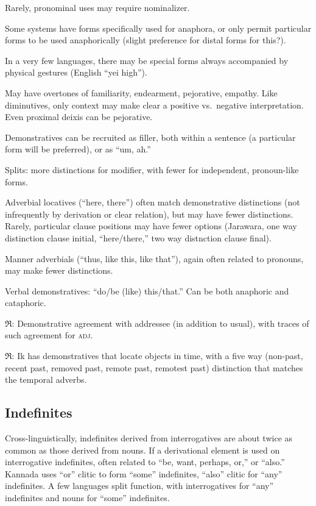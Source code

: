 \documentclass[11pt]{article}
\newcommand{\I}[1]{\textsc{#1}}   %
\newcommand{\rara}[1]{$\mathfrak{R}$: #1}
\begin{document}
Rarely, pronominal uses may require nominalizer.

Some systems have forms specifically used for anaphora, or only permit
particular forms to be used anaphorically (slight preference for
distal forms for this?).

In a very few languages, there may be special forms always accompanied
by physical gestures (English ``yei high'').

May have overtones of familiarity, endearment, pejorative,
empathy.  Like diminutives, only context may make clear a positive
vs.\ negative interpretation.  Even proximal deixis can be
pejorative. 

Demonstratives can be recruited as filler, both within a sentence (a
particular form will be preferred), or as ``um, ah.''

Splits: more distinctions for modifier, with fewer for independent,
pronoun-like forms. 

Adverbial locatives (``here, there'') often match demonstrative
distinctions (not infrequently by derivation or clear relation), but
may have fewer distinctions.  Rarely, particular clause positions may
have fewer options (Jarawara, one way distinction clause initial,
``here/there,'' two way distnction clause final).

Manner adverbials (``thus, like this, like that''), again often
related to pronouns, may make fewer distinctions.

Verbal demonstratives: ``do/be (like) this/that.'' Can be both
anaphoric and cataphoric.

\rara{Demonstrative agreement with addressee (in addition to usual),
  with traces of such agreement for \I{adj}.}

\rara{Ik has demonstratives that locate objects in time, with a
five way (non-past, recent past, removed past, remote past, remotest
past) distinction that matches the temporal adverbs.}

\subsection{Indefinites}
Cross-linguistically, indefinites derived from interrogatives are about
twice as common as those derived from nouns. If a derivational element
is used on interrogative indefinites, often related to ``be, want,
perhaps, or,'' or ``also.''  Kannada uses ``or'' clitic to form
``some'' indefinites, ``also'' clitic for ``any'' indefinites.  A few
languages split function, with interrogatives for ``any'' indefinites
and nouns for ``some'' indefinites.
\end{document}
